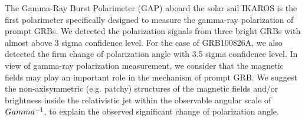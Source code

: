 


\bigskip



\bigskip

\noindent The Gamma-Ray Burst Polarimeter (GAP) aboard the solar sail IKAROS is the first polarimeter specifically designed to measure the gamma-ray polarization of prompt GRBs. We detected the polarization signals from three bright GRBs with almost above 3 sigma confidence level. For the case of GRB100826A, we also detected the firm change of polarization angle with 3.5 sigma confidence level. In view of gamma-ray polarization measurement, we consider that the magnetic fields may play an important role in the mechanism of prompt GRB. We suggest the non-axisymmetric (e.g. patchy) structures of the magnetic fields and/or brightness inside the relativistic jet within the observable angular scale of $\\Gamma^{-1}$, to explain the observed significant change of polarization angle.
